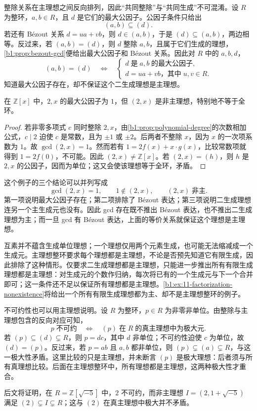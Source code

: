 整除关系在主理想之间反向排列，因此“共同整除”与“共同生成”不可混淆。设 \(R\) 为整环，\(a,b\in R\)，且 \(d\) 是它们的最大公因子。公因子条件只给出
\[
	(a,b)\subseteq(d).
\]
若还有 Bézout 关系 \(d=ua+vb\)，则 \(d\in(a,b)\)，于是 \((d)\subseteq(a,b)\)，两边相等。反过来，若 \((a,b)=(d)\)，则 \(d\) 整除 \(a,b\)，且属于它们生成的理想，\cref{b1:prop:bezout-gcd}便给出最大公因子和 Bézout 关系。因此对 \(R\) 中的 \(a,b,d\)，
\[
	(a,b)=(d)\quad\Longleftrightarrow\quad
	\left\{\begin{array}{l}
		d\;\text{是}\;a,b\;\text{的最大公因子},\\
		d=ua+vb\text{，其中}\;u,v\in R.
	\end{array}\right.
\]
知道最大公因子存在，却不保证这个二生成理想是主理想。

\begin{proposition}\label{b1:prop:integer-poly-nonprincipal}
	在 \(\mathbb Z[x]\) 中，\(2,x\) 的最大公因子为 \(1\)，但 \((2,x)\) 是非主理想，特别地不等于全环。
\end{proposition}
\begin{proof}
	若非零多项式 \(c\) 同时整除 \(2,x\)，由\cref{b1:prop:polynomial-degree}的次数相加公式，\(c\mid2\) 迫使 \(c\) 是常数，且为 \(\pm1\) 或 \(\pm2\)。后两者不整除 \(x\)，因为 \(x\) 的一次项系数为 \(1\)。故 \(\gcd(2,x)=1\)。然而若有 \(1=2f(x)+x\cdot g(x)\)，比较常数项就得到 \(1=2f(0)\)，不可能。因此 \((2,x)\ne\mathbb Z[x]\)。若 \((2,x)=(h)\)，则 \(h\) 是 \(2,x\) 的公因子，因而为单位；这又会使该理想等于全环，矛盾。
\end{proof}

这个例子的三个结论可以并列写成
\[
	\gcd(2,x)=1,\qquad 1\notin(2,x),\qquad (2,x)\;\text{非主}.
\]
第一项说明最大公因子存在；第二项排除了 Bézout 表达；第三项说明二生成理想连另一个主生成元也没有。因此 gcd 存在既不推出 Bézout 表达，也不推出二生成理想为主；而一旦 gcd 有 Bézout 表达，上面的等价关系就保证这个理想是主理想。

\ProseParagraphBreak
互素并不蕴含生成单位理想；一个理想仅用两个元素生成，也可能无法缩减成一个生成元。主理想整环要求每个理想都是主理想，不论是否预先知道它有限生成，因此排除了这种情形。仅要求二生成理想都是主理想，只能进一步推出所有有限生成理想都是主理想：对生成元的个数作归纳，每次将已有的一个生成元与下一个合并即可；这一条件还不足以保证所有理想都是主理想。\cref{b1:ex:11-factorization-nonexistence}将给出一个所有有限生成理想都为主、却不是主理想整环的例子。

\ProseParagraphBreak
不可约性也可以用主理想说明。设 \(R\) 为整环，\(p\in R\) 为非零非单位。由整除与主理想包含的反向对应可知，
\[
	p\;\text{不可约}\quad\Longleftrightarrow\quad (p)\;\text{在}\;R\;\text{的真主理想中为极大元}.
\]
若 \((p)\subseteq(d)\subsetneq R\)，则 \(p=dc\)，其中 \(d\) 非单位；不可约性迫使 \(c\) 为单位，故 \((d)=(p)\)。反过来，若 \(p=ab\) 且 \(a,b\) 都非单位，则 \((p)\subsetneq(a)\subsetneq R\)，与这一极大性矛盾。这里比较的只是主理想，并未断言 \((p)\) 是极大理想：后者须与所有真理想比较。后面在主理想整环中，所有理想都是主理想，这两种极大性才重合。

\ProseParagraphBreak
后文将证明，在 \(R=\mathbb Z[\sqrt{-5}]\) 中，\(2\) 不可约，而非主理想 \(I=(2,1+\sqrt{-5})\) 满足 \((2)\subsetneq I\subsetneq R\)；这与 \((2)\) 在真主理想中极大并不矛盾。
